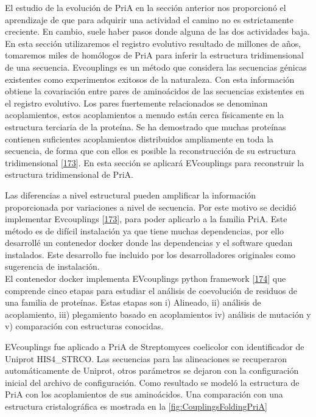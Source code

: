 \documentclass[12pt,twoside]{reedthesis}
\begin{document}
{  El estudio de la evolución de PriA en la sección anterior nos
  proporcionó el aprendizaje de que para adquirir una actividad el camino
  no es estrictamente creciente. En cambio, suele haber pasos donde alguna
  de las dos actividades baja. En esta sección utilizaremos el registro
  evolutivo resultado de millones de años, tomaremos miles de homólogos de
  PriA para inferir la estructura tridimensional de una secuencia.
  Evcouplings es un método que considera las secuencias génicas existentes
  como experimentos exitosos de la naturaleza. Con esta información
  obtiene la covariación entre pares de aminoácidos de las secuencias
  existentes en el registro evolutivo. Los pares fuertemente relacionados
  se denominan acoplamientos, estos acoplamientos a menudo están cerca
  físicamente en la estructura terciaria de la proteína. Se ha demostrado
  que muchas proteínas contienen suficientes acoplamientos distribuidos
  ampliamente en toda la secuencia, de forma que con ellos es posible la
  reconstrucción de su estructura tridimensional
  {[}\protect\hyperlink{ref-marks_protein_2011}{173}{]}. En esta sección
  se aplicará EVcouplings para reconstruir la estructura tridimensional de
  PriA.
  
  Las diferencias a nivel estructural pueden amplificar la información
  proporcionada por variaciones a nivel de secuencia. Por este motivo se
  decidió implementar Evcouplings
  {[}\protect\hyperlink{ref-marks_protein_2011}{173}{]}, para poder
  aplicarlo a la familia PriA. Este método es de difícil instalación ya
  que tiene muchas dependencias, por ello desarrollé un contenedor docker
  donde las dependencias y el software quedan instalados. Este desarrollo
  fue incluido por los desarrolladores originales como sugerencia de
  instalación.\\
  El contenedor docker implementa EVcouplings python framework
  {[}\protect\hyperlink{ref-hopf_evcouplings_2019}{174}{]} que comprende
  cinco etapas para estudiar el análisis de coevolución de residuos de una
  familia de proteínas. Estas etapas son i) Alineado, ii) análisis de
  acoplamiento, iii) plegamiento basado en acoplamientos iv) análisis de
  mutación y v) comparación con estructuras conocidas.
  
  EVcouplings fue aplicado a PriA de Streptomyces coelicolor con
  identificador de Uniprot HIS4\_STRCO. Las secuencias para las
  alineaciones se recuperaron automáticamente de Uniprot, otros parámetros
  se dejaron con la configuración inicial del archivo de configuración.
  Como resultado se modeló la estructura de PriA con los acoplamientos de
  sus aminoácidos. Una comparación con una estructura cristalográfica es
  mostrada en la \autoref{fig:CouplingsFoldingPriA}
  
}
\end{document}
